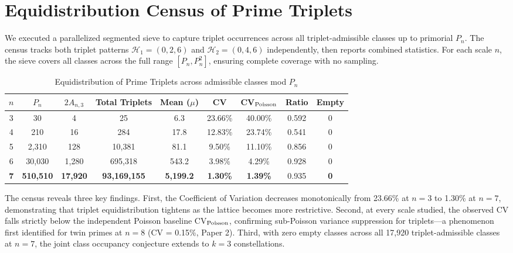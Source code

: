 \documentclass[11pt]{article}
\begin{document}
\section{Equidistribution Census of Prime Triplets}

We executed a parallelized segmented sieve to capture triplet occurrences across all triplet-admissible classes up to primorial $P_n$. The census tracks both triplet patterns $\mathcal{H}_1 = (0, 2, 6)$ and $\mathcal{H}_2 = (0, 4, 6)$ independently, then reports combined statistics. For each scale $n$, the sieve covers all classes across the full range $[P_n, P_n^2]$, ensuring complete coverage with no sampling.

\begin{table}[h]
\centering
\caption{Equidistribution of Prime Triplets across admissible classes mod $P_n$}
\label{tab:triplet_census}
\begin{tabular}{ccccccccc}
\toprule
$n$ & $P_n$ & $2A_{n,3}$ & Total Triplets & Mean ($\mu$) & CV & CV$_{\rm Poisson}$ & Ratio & Empty \\
\midrule
3 & 30 & 4 & 25 & 6.3 & 23.66\% & 40.00\% & 0.592 & 0 \\
4 & 210 & 16 & 284 & 17.8 & 12.83\% & 23.74\% & 0.541 & 0 \\
5 & 2{,}310 & 128 & 10{,}381 & 81.1 & 9.50\% & 11.10\% & 0.856 & 0 \\
6 & 30{,}030 & 1{,}280 & 695{,}318 & 543.2 & 3.98\% & 4.29\% & 0.928 & 0 \\
\textbf{7} & \textbf{510{,}510} & \textbf{17{,}920} & \textbf{93{,}169{,}155} & \textbf{5{,}199.2} & \textbf{1.30\%} & \textbf{1.39\%} & 0.935 & \textbf{0} \\
\bottomrule
\end{tabular}

\vspace{0.5em}
\end{table}

The census reveals three key findings. First, the Coefficient of Variation decreases monotonically from 23.66\% at $n=3$ to 1.30\% at $n=7$, demonstrating that triplet equidistribution tightens as the lattice becomes more restrictive. Second, at every scale studied, the observed CV falls strictly below the independent Poisson baseline CV$_{\rm Poisson}$, confirming sub-Poisson variance suppression for triplets---a phenomenon first identified for twin primes at $n=8$ (CV = 0.15\%, Paper 2). Third, with zero empty classes across all 17{,}920 triplet-admissible classes at $n=7$, the joint class occupancy conjecture extends to $k=3$ constellations.
\end{document}
